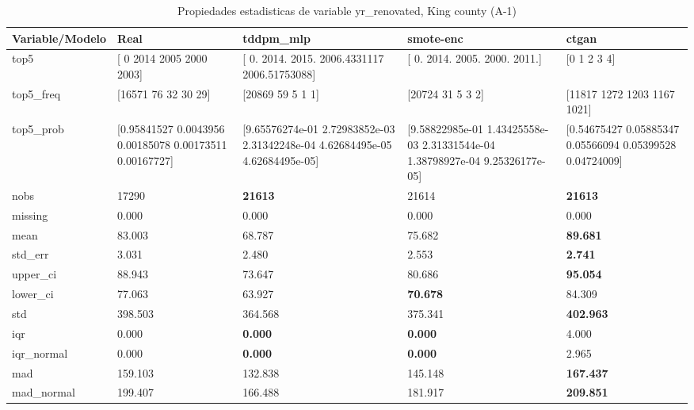 \begin{table}[H]
\centering
\fontsize{8}{14}\selectfont
\caption{Propiedades  estadisticas de variable yr\_renovated, King county (A-1)}
\label{table-stats-king county-a-1-yr_renovated}
\begin{tabular}{|l|m{10em}|m{10em}|m{10em}|m{10em}|}
\hline
 \rowcolor[gray]{0.8}
Variable/Modelo & Real & tddpm\_mlp & smote-enc & ctgan \\
\hline top5 & [   0 2014 2005 2000 2003] & [   0.         2014.         2015.         2006.4331117  2006.51753088] & [   0. 2014. 2005. 2000. 2011.] & [0 1 2 3 4] \\
\hline top5\_freq & [16571    76    32    30    29] & [20869    59     5     1     1] & [20724    31     5     3     2] & [11817  1272  1203  1167  1021] \\
\hline top5\_prob & [0.95841527 0.0043956  0.00185078 0.00173511 0.00167727] & [9.65576274e-01 2.72983852e-03 2.31342248e-04 4.62684495e-05
 4.62684495e-05] & [9.58822985e-01 1.43425558e-03 2.31331544e-04 1.38798927e-04
 9.25326177e-05] & [0.54675427 0.05885347 0.05566094 0.05399528 0.04724009] \\
\hline nobs & 17290 & \bfseries 21613 & \cellcolor[rgb]{0.9, 0.54, 0.52} 21614 & \bfseries 21613 \\
\hline missing & 0.000 & 0.000 & 0.000 & 0.000 \\
\hline mean & 83.003 & \cellcolor[rgb]{0.9, 0.54, 0.52} 68.787 & 75.682 & \bfseries 89.681 \\
\hline std\_err & 3.031 & \cellcolor[rgb]{0.9, 0.54, 0.52} 2.480 & 2.553 & \bfseries 2.741 \\
\hline upper\_ci & 88.943 & \cellcolor[rgb]{0.9, 0.54, 0.52} 73.647 & 80.686 & \bfseries 95.054 \\
\hline lower\_ci & 77.063 & \cellcolor[rgb]{0.9, 0.54, 0.52} 63.927 & \bfseries 70.678 & 84.309 \\
\hline std & 398.503 & \cellcolor[rgb]{0.9, 0.54, 0.52} 364.568 & 375.341 & \bfseries 402.963 \\
\hline iqr & 0.000 & \bfseries 0.000 & \bfseries 0.000 & \cellcolor[rgb]{0.9, 0.54, 0.52} 4.000 \\
\hline iqr\_normal & 0.000 & \bfseries 0.000 & \bfseries 0.000 & \cellcolor[rgb]{0.9, 0.54, 0.52} 2.965 \\
\hline mad & 159.103 & \cellcolor[rgb]{0.9, 0.54, 0.52} 132.838 & 145.148 & \bfseries 167.437 \\
\hline mad\_normal & 199.407 & \cellcolor[rgb]{0.9, 0.54, 0.52} 166.488 & 181.917 & \bfseries 209.851 \\

\end{tabular}
\end{table}
